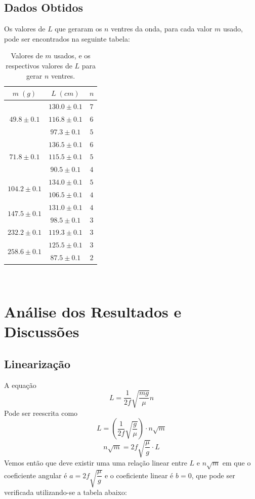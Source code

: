 \documentclass[12pt,a4paper]{article}
\begin{document}
\subsection{Dados Obtidos}
Os valores de $L$ que geraram os $n$ ventres da onda, para cada valor $m$ usado, pode ser encontrados na seguinte tabela:\\

\begin{table}[!htbp]
\centering
\def\arraystretch{1.3}
\caption{Valores de $m$ usados, e os respectivos valores de $L$ para gerar $n$ ventres.}
\label{Resultados}
\begin{tabular}{|c|c|c|}
\hline
$m \; (g)$ & $L \; (cm)$ & $n$\\
\hline
\multirow{3}{*}{$49.8 \pm 0.1$} & $130.0 \pm 0.1$ & $7$\\
$            $ & $116.8 \pm 0.1$ & $6$\\
$            $ & $ 97.3 \pm 0.1$ & $5$\\
\hline
\multirow{3}{*}{$71.8 \pm 0.1$} & $136.5 \pm 0.1$ & $6$\\
$            $ & $115.5 \pm 0.1$ & $5$\\
$            $ & $ 90.5 \pm 0.1$ & $4$\\
\hline
\multirow{2}{*}{$104.2 \pm 0.1$} & $134.0 \pm 0.1$ & $5$\\
$             $ & $106.5 \pm 0.1$ & $4$\\
\hline
\multirow{2}{*}{$147.5 \pm 0.1$} & $131.0 \pm 0.1$ & $4$\\
$             $ & $ 98.5 \pm 0.1$ & $3$\\
\hline
$232.2 \pm 0.1$ & $119.3 \pm 0.1$ & $3$\\
\hline
\multirow{2}{*}{$258.6 \pm 0.1$} & $125.5 \pm 0.1$ & $3$\\
$             $ & $ 87.5 \pm 0.1$ & $2$\\
\hline

\end{tabular} \\

\end{table}


\section{Análise dos Resultados e Discussões}
\subsection{Linearização}
A equação
$$ L = \dfrac{1}{2f} \sqrt{\dfrac{mg}{\mu}} n $$
Pode ser reescrita como
$$ L = (\dfrac{1}{2f} \sqrt{\dfrac{g}{\mu}}) \cdot n\sqrt{m} $$
$$ n \sqrt{m} = 2f\sqrt{\frac{\mu}{g}} \cdot L $$
Vemos então que deve existir uma uma relação linear entre $L$ e $n\sqrt{m}$ em que o coeficiente angular é $a = 2f \sqrt{\dfrac{\mu}{g}}$ e o coeficiente linear é $b = 0$, que pode ser verificada utilizando-se a tabela abaixo:
\end{document}

